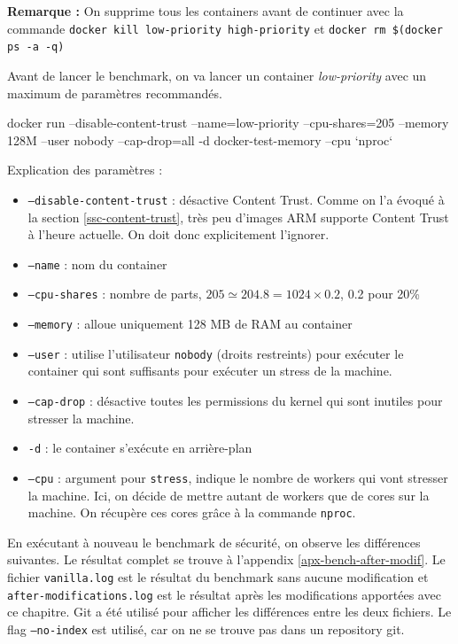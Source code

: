 \documentclass[11pt,a4paper,oneside]{report}
\newcommand{\code}[1]{\texttt{#1}}
\begin{document}
\textbf{Remarque :} On supprime tous les containers avant de continuer avec la commande \code{docker kill low-priority high-priority} et \code{docker rm \$(docker ps -a -q)}

Avant de lancer le benchmark, on va lancer un container \textit{low-priority} avec un maximum de paramètres recommandés.

\begin{textcode}
docker run --disable-content-trust --name=low-priority --cpu-shares=205 --memory 128M --user nobody --cap-drop=all -d docker-test-memory --cpu `nproc`
\end{textcode}

Explication des paramètres :
\begin{itemize}
\item \code{--disable-content-trust} : désactive Content Trust. Comme on l'a évoqué à la section \ref{ssc-content-trust}, très peu d'images ARM supporte Content Trust à l'heure actuelle. On doit donc explicitement l'ignorer.
\item \code{--name} : nom du container
\item \code{--cpu-shares} : nombre de parts, $205 \simeq 204.8 = 1024 \times 0.2$, 0.2 pour 20\%
\item \code{--memory} : alloue uniquement 128 MB de RAM au container
\item \code{--user} : utilise l'utilisateur \code{nobody} (droits restreints) pour exécuter le container qui sont suffisants pour exécuter un stress de la machine.
\item \code{--cap-drop} : désactive toutes les permissions du kernel qui sont inutiles pour stresser la machine.
\item \code{-d} : le container s'exécute en arrière-plan
\item \code{--cpu} : argument pour \code{stress}, indique le nombre de workers qui vont stresser la machine. Ici, on décide de mettre autant de workers que de cores sur la machine. On récupère ces cores grâce à la commande \code{nproc}.
\end{itemize}

En exécutant à nouveau le benchmark de sécurité, on observe les différences suivantes. Le résultat complet se trouve à l'appendix \ref{apx-bench-after-modif}. Le fichier \code{vanilla.log} est le résultat du benchmark sans aucune modification et \code{after-modifications.log} est le résultat après les modifications apportées avec ce chapitre. Git a été utilisé pour afficher les différences entre les deux fichiers. Le flag \code{--no-index} est utilisé, car on ne se trouve pas dans un repository git.
\end{document}
